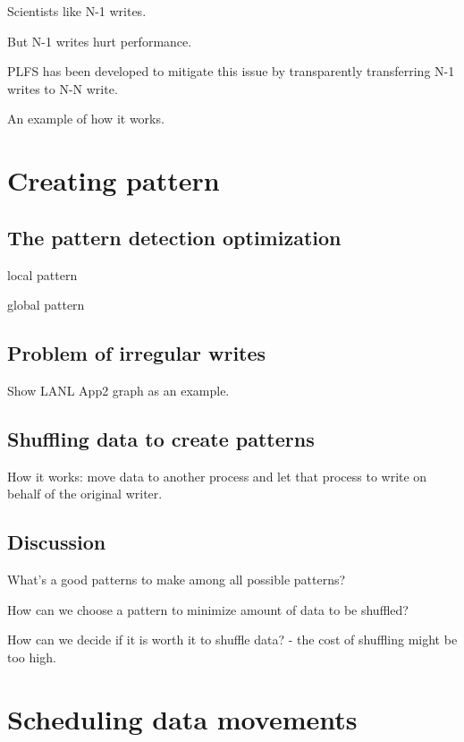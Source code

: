 \documentclass{acm_proc_article-sp}
\begin{document}
Scientists like N-1 writes.


But N-1 writes hurt performance.

PLFS has been developed to mitigate this issue
by transparently transferring N-1 writes to N-N
write.

An example of how it works.


\section{Creating pattern}
\subsection{The pattern detection optimization}
local pattern

global pattern

\subsection{Problem of irregular writes}
Show LANL App2 graph as an example.

\subsection{Shuffling data to create patterns}
How it works: move data to another process and let
that process to write on behalf of the original writer.

\subsection{Discussion}
What's a good patterns to make among 
all possible patterns?

How can we choose a pattern to minimize
amount of data to be shuffled?

How can we decide if it is worth it to
shuffle data? - the cost of shuffling might be
too high.




\section{Scheduling data movements}


\end{document}
